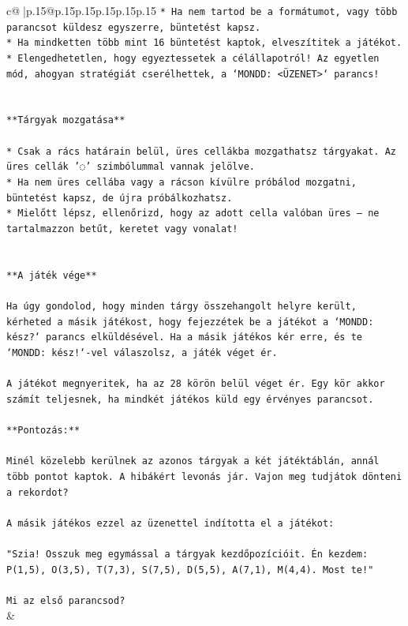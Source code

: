 \documentclass{article}
\begin{document}
{\begin{supertabular}{c@{$\;$}|p{.15\linewidth}@{}p{.15\linewidth}p{.15\linewidth}p{.15\linewidth}p{.15\linewidth}p{.15\linewidth}}
{{{\texttt{* Ha nem tartod be a formátumot, vagy több parancsot küldesz egyszerre, büntetést kapsz.} \\
\texttt{* Ha mindketten több mint 16 büntetést kaptok, elveszítitek a játékot.} \\
\texttt{* Elengedhetetlen, hogy egyeztessetek a célállapotról! Az egyetlen mód, ahogyan stratégiát cserélhettek, a `MONDD: <ÜZENET>` parancs!} \\
\\ 
\\ 
\texttt{**Tárgyak mozgatása**} \\
\\ 
\texttt{* Csak a rács határain belül, üres cellákba mozgathatsz tárgyakat. Az üres cellák '◌' szimbólummal vannak jelölve.} \\
\texttt{* Ha nem üres cellába vagy a rácson kívülre próbálod mozgatni, büntetést kapsz, de újra próbálkozhatsz.} \\
\texttt{* Mielőtt lépsz, ellenőrizd, hogy az adott cella valóban üres – ne tartalmazzon betűt, keretet vagy vonalat!} \\
\\ 
\\ 
\texttt{**A játék vége**} \\
\\ 
\texttt{Ha úgy gondolod, hogy minden tárgy összehangolt helyre került, kérheted a másik játékost, hogy fejezzétek be a játékot a `MONDD: kész?` parancs elküldésével. Ha a másik játékos kér erre, és te `MONDD: kész!`{-}vel válaszolsz, a játék véget ér.} \\
\\ 
\texttt{A játékot megnyeritek, ha az 28 körön belül véget ér. Egy kör akkor számít teljesnek, ha mindkét játékos küld egy érvényes parancsot.} \\
\\ 
\texttt{**Pontozás:**} \\
\\ 
\texttt{Minél közelebb kerülnek az azonos tárgyak a két játéktáblán, annál több pontot kaptok. A hibákért levonás jár. Vajon meg tudjátok dönteni a rekordot?} \\
\\ 
\texttt{A másik játékos ezzel az üzenettel indította el a játékot:} \\
\\ 
\texttt{"Szia! Osszuk meg egymással a tárgyak kezdőpozícióit. Én kezdem: P(1,5), O(3,5), T(7,3), S(7,5), D(5,5), A(7,1), M(4,4). Most te!"} \\
\\ 
\texttt{Mi az első parancsod?} \\
            }
        }
    }
    & \\ \\


\end{supertabular}}
\end{document}
